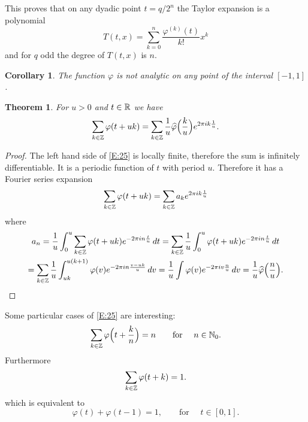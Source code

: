 \documentclass[10pt]{amsart}
\newtheorem{thm}{Theorem}
\newtheorem*{cor*}{Corollary}
\theoremstyle{definition}
\theoremstyle{remark}
\begin{document}
This proves that on any dyadic point $t=q/2^n$ the Taylor expansion is a polynomial
\begin{equation}\label{E:24}
T(t,x)=\sum_{k=0}^n \frac{\varphi^{(k)}(t)}{k!} x^k
\end{equation}
and for $q$  odd the degree of $T(t,x)$ is $n$. 
\begin{cor*}
The function $\varphi$ is not analytic on any point of the interval $[-1,1]$.
\end{cor*}
\begin{thm}\label{T:5}
For $u>0$ and $t\in\mathbb{R}$ we have
\begin{equation}\label{E:25}
\sum_{k\in\mathbb{Z}}\varphi(t+uk)=\sum_{k\in\mathbb{Z}}\frac{1}{u}
\widehat\varphi\Bigl(\frac{k}{u}\Bigr)e^{2\pi i k\frac1u}.
\end{equation}
\end{thm}
\begin{proof}
The left hand side of \eqref{E:25} is locally finite, therefore the sum is 
infinitely differentiable. It is a periodic function of $t$ with period $u$. Therefore
it has a Fourier series expansion
\[\sum_{k\in\mathbb{Z}}\varphi(t+uk)=\sum_{k\in\mathbb{Z}}a_k e^{2\pi i k\frac1u}\]
where
\begin{multline*}
a_n=\frac{1}{u}\int_0^u\sum_{k\in\mathbb{Z}}\varphi(t+uk)e^{-2\pi i n\frac{t}{u}}\,dt=
\sum_{k\in\mathbb{Z}}\frac{1}{u}\int_0^u\varphi(t+uk)e^{-2\pi i n\frac{t}{u}}\,dt\\=
\sum_{k\in\mathbb{Z}}\frac{1}{u}\int_{uk}^{u(k+1)}\varphi(v)e^{-2\pi i n\frac{v-uk}{u}}\,dv=
\frac{1}{u}\int\varphi(v)e^{-2\pi i v\frac{n}{u}}\,dv=
\frac{1}{u}\widehat\varphi\Bigl(\frac{n}{u}\Bigr).
\end{multline*}
\end{proof}

Some particular cases of \eqref{E:25} are interesting:
\begin{equation}\label{E:26}
\sum_{k\in\mathbb{Z}}\varphi\Bigl(t+\frac{k}{n}\Bigr)=n \qquad \text{for }\quad n\in\mathbb{N}_{0}.
\end{equation}
Furthermore
\begin{equation}\label{E:27}
\sum_{k\in\mathbb{Z}}\varphi(t+k)=1.
\end{equation}
which is equivalent to 
\begin{equation}\label{E:28}
\varphi(t)+\varphi(t-1)=1,\qquad \text{for }\quad t\in[0,1].
\end{equation}
\end{document}
